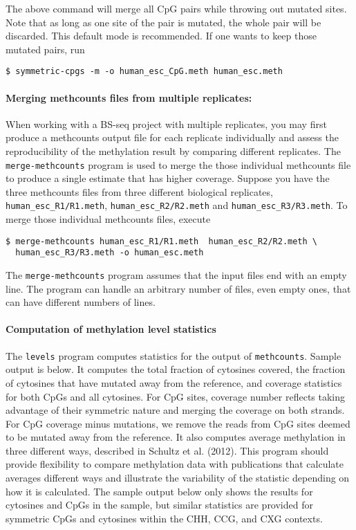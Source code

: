 \documentclass[10pt]{article}
\newcommand{\prog}[1]{\texttt{#1}}
\newcommand{\fn}[1]{\texttt{#1}}
\begin{document}
The above command will merge all CpG pairs while throwing out mutated sites.
Note that as long as one site of the pair is mutated, the whole pair will
be discarded. This default mode is recommended. If one wants to keep
those mutated pairs, run

\begin{verbatim}
$ symmetric-cpgs -m -o human_esc_CpG.meth human_esc.meth
\end{verbatim}

\paragraph{Merging methcounts files from multiple replicates:}
\label{sec:merg-methc-file}
When working with a BS-seq project with multiple replicates, you may
first produce a methcounts output file for each replicate individually
and assess the reproducibility of the methylation result by comparing
different replicates. The \prog{merge-methcounts} program is used to
merge the those individual methcounts file to produce a single
estimate that has higher coverage. Suppose you have the three
methcounts files from three different biological replicates,
\fn{human\_esc\_R1/R1.meth}, \fn{human\_esc\_R2/R2.meth} and
\fn{human\_esc\_R3/R3.meth}. To merge those individual methcounts files,
execute
\begin{verbatim}
$ merge-methcounts human_esc_R1/R1.meth  human_esc_R2/R2.meth \
  human_esc_R3/R3.meth -o human_esc.meth
\end{verbatim}
The \prog{merge-methcounts} program assumes that the input files
end with an empty line. The program can handle an arbitrary number
of files, even empty ones, that can have different numbers of lines.

\paragraph{Computation of methylation level statistics}
The \prog{levels} program computes statistics for the output of
\prog{methcounts}. Sample output is below. It computes the total
fraction of cytosines covered, the fraction of cytosines that have
mutated away from the reference, and coverage statistics for both
CpGs and all cytosines. For CpG sites, coverage number reflects taking
advantage of their symmetric nature and merging the coverage on both
strands. For CpG coverage minus mutations, we remove the reads from
CpG sites deemed to be mutated away from the reference. It also computes
average methylation in three different ways, described in Schultz et al.
(2012). This program should provide flexibility to compare methylation data
with publications that calculate averages different ways and illustrate the
variability of the statistic depending on how it is calculated. The
sample output below only shows the results for cytosines and CpGs in
the sample, but similar statistics are provided for symmetric CpGs and
cytosines within the CHH, CCG, and CXG contexts.
\end{document}
